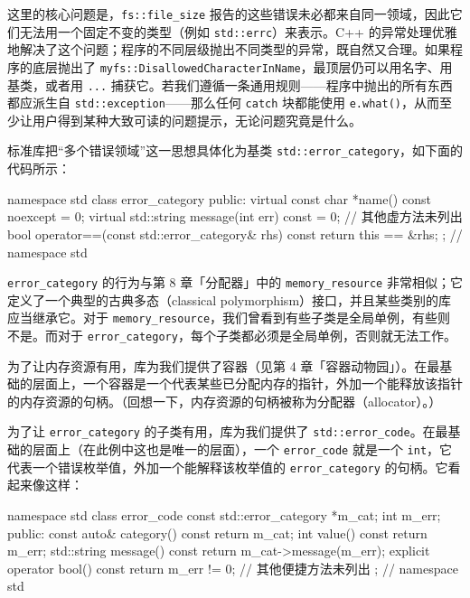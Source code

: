 这里的核心问题是，\texttt{fs::\allowbreak{}file\_\allowbreak{}size} 报告的这些错误未必都来自同一领域，因此它们无法用一个固定不变的类型（例如 \texttt{std::\allowbreak{}errc}）来表示。C++ 的异常处理优雅地解决了这个问题；程序的不同层级抛出不同类型的异常，既自然又合理。如果程序的底层抛出了 \texttt{myfs::\allowbreak{}Disallowed\allowbreak{}Character\allowbreak{}In\allowbreak{}Name}，最顶层仍可以用名字、用基类，或者用 \texttt{...} 捕获它。若我们遵循一条通用规则——程序中抛出的所有东西都应派生自 \texttt{std::\allowbreak{}exception}——那么任何 \texttt{catch} 块都能使用 \texttt{e.\allowbreak{}what(\allowbreak{})\allowbreak{}}，从而至少让用户得到某种大致可读的问题提示，无论问题究竟是什么。

标准库把“多个错误领域”这一思想具体化为基类 \texttt{std::\allowbreak{}error\_\allowbreak{}category}，如下面的代码所示：

\begin{codebox}[cpp]
  namespace std {
  class error_category {
  public:
    virtual const char *name() const noexcept = 0;
    virtual std::string message(int err) const = 0;
    // 其他虚方法未列出
    bool operator==(const std::error_category& rhs) const {
      return this == &rhs;
    }
  };
  } // namespace std
\end{codebox}

\texttt{error\_\allowbreak{}category} 的行为与第 8 章「分配器」中的 \texttt{memory\_\allowbreak{}resource} 非常相似；它定义了一个典型的古典多态（classical polymorphism）接口，并且某些类别的库应当继承它。对于 \texttt{memory\_\allowbreak{}resource}，我们曾看到有些子类是全局单例，有些则不是。而对于 \texttt{error\_\allowbreak{}category}，每个子类都必须是全局单例，否则就无法工作。

为了让内存资源有用，库为我们提供了容器（见第 4 章「容器动物园」）。在最基础的层面上，一个容器是一个代表某些已分配内存的指针，外加一个能释放该指针的内存资源的句柄。（回想一下，内存资源的句柄被称为分配器（allocator）。）

为了让 \texttt{error\_\allowbreak{}category} 的子类有用，库为我们提供了 \texttt{std::\allowbreak{}error\_\allowbreak{}code}。在最基础的层面上（在此例中这也是唯一的层面），一个 \texttt{error\_\allowbreak{}code} 就是一个 \texttt{int}，它代表一个错误枚举值，外加一个能解释该枚举值的 \texttt{error\_\allowbreak{}category} 的句柄。它看起来像这样：

\begin{codebox}[cpp]
    namespace std {
    class error_code {
      const std::error_category *m_cat;
      int m_err;
    public:
      const auto& category() const { return m_cat; }
      int value() const { return m_err; }
      std::string message() const { return m_cat->message(m_err); }
      explicit operator bool() const { return m_err != 0; }
      // 其他便捷方法未列出
    };
    } // namespace std
\end{codebox}

